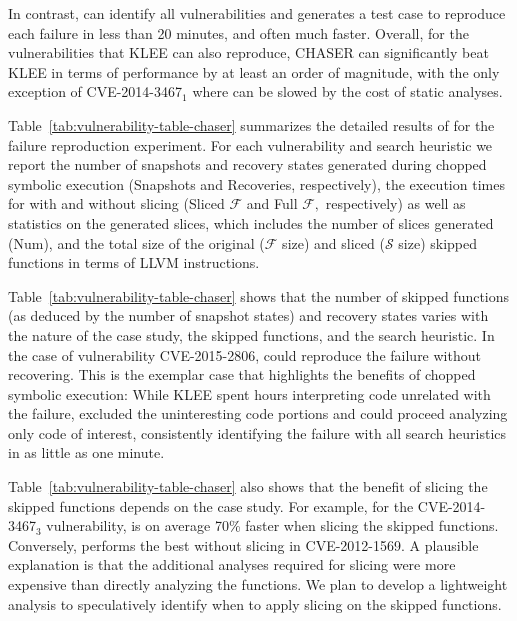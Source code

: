 In contrast, \toolname can identify all vulnerabilities and generates
a test case to reproduce each failure in less than 20 minutes, and
often much faster. Overall, for the vulnerabilities that KLEE can also
reproduce, CHASER can significantly beat KLEE in terms of performance
by at least an order of magnitude, with the only exception of
CVE-2014-3467$_1$ where \toolname can be slowed by the cost of static
analyses.

Table~\ref{tab:vulnerability-table-chaser} summarizes the detailed
results of \toolname for the failure reproduction experiment. For each
vulnerability and search heuristic we report the number of snapshots
and recovery states generated during chopped symbolic execution
(Snapshots and Recoveries, respectively), the execution times for
\toolname with and without slicing (Sliced $\mathcal{F}$ and Full
$\mathcal{F},$ respectively) as well as statistics on the generated
slices, which includes the number of slices generated (Num), and the
total size of the original ($\mathcal{F}$ size) and sliced
($\mathcal{S}$ size) skipped functions in terms of LLVM instructions.

Table~\ref{tab:vulnerability-table-chaser} shows that the number of
skipped functions (as deduced by the number of snapshot states) and
recovery states varies with the nature of the case study, the skipped
functions, and the search heuristic. In the case of vulnerability
CVE-2015-2806, \toolname could reproduce the failure without
recovering. This is the exemplar case that highlights the benefits of
chopped symbolic execution: While KLEE spent hours interpreting code
unrelated with the failure, \toolname excluded the uninteresting code
portions and could proceed analyzing only code of interest,
consistently identifying the failure with all search heuristics in as
little as one minute.

Table~\ref{tab:vulnerability-table-chaser} also shows that the benefit
of slicing the skipped functions depends on the case study. For
example, for the CVE-2014-3467$_3$ vulnerability, \toolname is on
average 70\% faster when slicing the skipped functions. Conversely,
\toolname performs the best without slicing in CVE-2012-1569. A
plausible explanation is that the additional analyses required for
slicing were more expensive than directly analyzing the functions. We
plan to develop a lightweight analysis to speculatively identify when
to apply slicing on the skipped functions.



